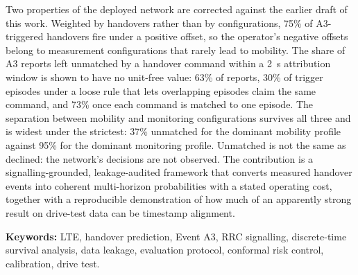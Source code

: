 Two properties of the deployed network are corrected against the earlier draft of this work. Weighted by handovers rather than by configurations, 75\% of A3-triggered handovers fire under a positive offset, so the operator's negative offsets belong to measurement configurations that rarely lead to mobility. The share of A3 reports left unmatched by a handover command within a 2~s attribution window is shown to have no unit-free value: 63\% of reports, 30\% of trigger episodes under a loose rule that lets overlapping episodes claim the same command, and 73\% once each command is matched to one episode. The separation between mobility and monitoring configurations survives all three and is widest under the strictest: 37\% unmatched for the dominant mobility profile against 95\% for the dominant monitoring profile. Unmatched is not the same as declined: the network's decisions are not observed. The contribution is a signalling-grounded, leakage-audited framework that converts measured handover events into coherent multi-horizon probabilities with a stated operating cost, together with a reproducible demonstration of how much of an apparently strong result on drive-test data can be timestamp alignment.

\vspace{1em}\noindent\textbf{Keywords:} LTE, handover prediction, Event A3, RRC signalling, discrete-time survival analysis, data leakage, evaluation protocol, conformal risk control, calibration, drive test.

